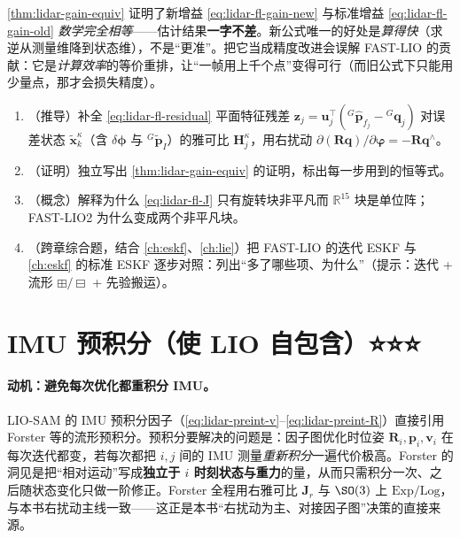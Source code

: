 \begin{pitfall}
\cref{thm:lidar-gain-equiv} 证明了新增益 \cref{eq:lidar-fl-gain-new} 与标准增益 \cref{eq:lidar-fl-gain-old} \emph{数学完全相等}——估计结果\textbf{一字不差}。新公式唯一的好处是\emph{算得快}（求逆从测量维降到状态维），不是“更准”。把它当成精度改进会误解 FAST-LIO 的贡献：它是\emph{计算效率}的等价重排，让“一帧用上千个点”变得可行（而旧公式下只能用少量点，那才会损失精度）。
\end{pitfall}

\begin{practice}
\begin{enumerate}
  \item （推导）补全 \cref{eq:lidar-fl-residual} 平面特征残差 $\mathbf{z}_j=\mathbf{u}_j^\top({}^G\hat{\mathbf{p}}_{f_j}-{}^G\mathbf{q}_j)$ 对误差状态 $\tilde{\mathbf{x}}^\kappa_k$（含 $\delta\boldsymbol{\phi}$ 与 ${}^G\tilde{\mathbf{p}}_I$）的雅可比 $\mathbf{H}^\kappa_j$，用右扰动 $\partial(\mathbf{R}\mathbf{q})/\partial\boldsymbol{\varphi}=-\mathbf{R}\mathbf{q}^\wedge$。
  \item （证明）独立写出 \cref{thm:lidar-gain-equiv} 的证明，标出每一步用到的恒等式。
  \item （概念）解释为什么 \cref{eq:lidar-fl-J} 只有旋转块非平凡而 $\mathbb{R}^{15}$ 块是单位阵；FAST-LIO2 为什么变成两个非平凡块。
  \item （跨章综合题，结合 \cref{ch:eskf}、\cref{ch:lie}）把 FAST-LIO 的迭代 ESKF 与 \cref{ch:eskf} 的标准 ESKF 逐步对照：列出“多了哪些项、为什么”（提示：迭代 + 流形 $\boxplus/\boxminus$ + 先验搬运）。
\end{enumerate}
\end{practice}

\section{IMU 预积分（使 LIO 自包含）⭐⭐⭐}
\label{sec:lidar-preint}

\paragraph{动机：避免每次优化都重积分 IMU。}
LIO-SAM 的 IMU 预积分因子（\cref{eq:lidar-preint-v}–\cref{eq:lidar-preint-R}）直接引用 Forster 等的流形预积分\cite{forster2017preintegration}。预积分要解决的问题是：因子图优化时位姿 $\mathbf{R}_i,\mathbf{p}_i,\mathbf{v}_i$ 在每次迭代都变，若每次都把 $i,j$ 间的 IMU 测量\emph{重新积分}一遍代价极高。Forster 的洞见是把“相对运动”写成\textbf{独立于 $i$ 时刻状态与重力}的量，从而只需积分一次、之后随状态变化只做一阶修正。Forster 全程用右雅可比 $\mathbf{J}_r$ 与 $\SO(3)$ 上 $\mathrm{Exp/Log}$，与本书右扰动主线一致——这正是本书“右扰动为主、对接因子图”决策的直接来源。

